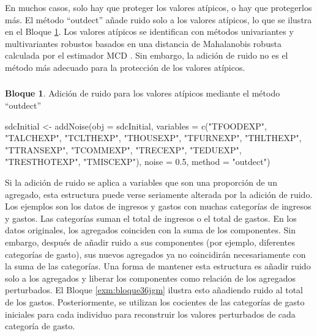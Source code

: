 \documentclass[
]{book}
\newenvironment{Shaded}{\begin{snugshade}}{\end{snugshade}}
\newcommand{\AttributeTok}[1]{\textcolor[rgb]{0.77,0.63,0.00}{#1}}
\newcommand{\FloatTok}[1]{\textcolor[rgb]{0.00,0.00,0.81}{#1}}
\newcommand{\FunctionTok}[1]{\textcolor[rgb]{0.00,0.00,0.00}{#1}}
\newcommand{\NormalTok}[1]{#1}
\newcommand{\OtherTok}[1]{\textcolor[rgb]{0.56,0.35,0.01}{#1}}
\newcommand{\StringTok}[1]{\textcolor[rgb]{0.31,0.60,0.02}{#1}}
\theoremstyle{definition}
\theoremstyle{definition}
\newtheorem{example}{Bloque}[chapter]
\theoremstyle{definition}
\theoremstyle{definition}
\theoremstyle{remark}
\begin{document}
En muchos casos, solo hay que proteger los valores atípicos, o hay que protegerlos más. El método ``outdect'' añade ruido solo a los valores atípicos, lo que se ilustra en el Bloque \ref{exm:bloque35jgm}. Los valores atípicos se identifican con métodos univariantes y multivariantes robustos basados en una distancia de Mahalanobis robusta calculada por el estimador MCD \citep{TMKC14}. Sin embargo, la adición de ruido no es el método más adecuado para la protección de los valores atípicos.

\hypertarget{section-9}{%
\subsubsection{}\label{section-9}}

\begin{example}
\protect\hypertarget{exm:bloque35jgm}{}\label{exm:bloque35jgm}Adición de ruido para los valores atípicos mediante el método ``outdect''
\end{example}

\begin{Shaded}
\begin{Highlighting}[]
\NormalTok{sdcInitial }\OtherTok{\textless{}{-}} \FunctionTok{addNoise}\NormalTok{(}\AttributeTok{obj =}\NormalTok{ sdcInitial, }\AttributeTok{variables =} \FunctionTok{c}\NormalTok{(}\StringTok{"TFOODEXP"}\NormalTok{, }\StringTok{"TALCHEXP"}\NormalTok{, }\StringTok{"TCLTHEXP"}\NormalTok{, }\StringTok{"THOUSEXP"}\NormalTok{, }
                                                       \StringTok{"TFURNEXP"}\NormalTok{, }\StringTok{"THLTHEXP"}\NormalTok{, }\StringTok{"TTRANSEXP"}\NormalTok{, }\StringTok{"TCOMMEXP"}\NormalTok{, }
                                                       \StringTok{"TRECEXP"}\NormalTok{, }\StringTok{"TEDUEXP"}\NormalTok{, }\StringTok{"TRESTHOTEXP"}\NormalTok{, }\StringTok{"TMISCEXP"}\NormalTok{), }
                       \AttributeTok{noise =} \FloatTok{0.5}\NormalTok{, }\AttributeTok{method =} \StringTok{"outdect"}\NormalTok{)}
\end{Highlighting}
\end{Shaded}

Si la adición de ruido se aplica a variables que son una proporción de un agregado, esta estructura puede verse seriamente alterada por la adición de ruido. Los ejemplos son los datos de ingresos y gastos con muchas categorías de ingresos y gastos. Las categorías suman el total de ingresos o el total de gastos. En los datos originales, los agregados coinciden con la suma de los componentes. Sin embargo, después de añadir ruido a sus componentes (por ejemplo, diferentes categorías de gasto), sus nuevos agregados ya no coincidirán necesariamente con la suma de las categorías. Una forma de mantener esta estructura es añadir ruido solo a los agregados y liberar los componentes como relación de los agregados perturbados. El Bloque \ref{exm:bloque36jgm} ilustra esto añadiendo ruido al total de los gastos. Posteriormente, se utilizan los cocientes de las categorías de gasto iniciales para cada individuo para reconstruir los valores perturbados de cada categoría de gasto.
\end{document}
